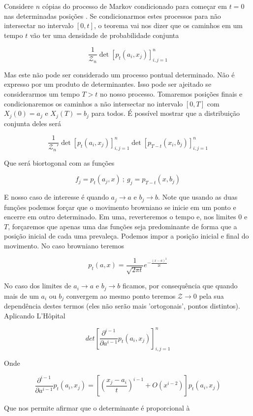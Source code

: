 Considere $n$ cópias do processo de Markov condicionado para começar em $t=0$ nas determinadas posições . Se condicionarmos estes processos para não intersectar no intervalo $[0,t]$, o teorema vai nos dizer que os caminhos em um tempo $t$ vão ter uma densidade de probabilidade conjunta

\[
	\frac{1}{\mathcal{Z}_n} \det{[p_t(a_i, x_j)]^{n}_{i,j=1}}
\]

Mas este não pode ser considerado um processo pontual determinado. Não é expresso por um produto de determinantes. Isso pode ser ajeitado se considerarmos um tempo $T > t$ no nosso processo. Tomaremos  posições finais e condicionaremos os caminhos a não intersectar no intervalo $[0, T]$ com $X_j(0) = a_j$ e $X_j(T) = b_j$ para todos. É possível mostrar que a distribuição conjunta deles será

\[
	\frac{1}{\mathcal{Z}_n'} \det{[p_t(a_i, x_j)]^{n}_{i,j=1}} \det{[p_{T-t}(x_i, b_j)]^{n}_{i,j=1}}
\]

Que será biortogonal com as funções

\[
	f_j = p_t(a_j, x) \ ; \ g_j = p_{T-t}(x, b_j)
\]

E nosso caso de interesse é quando $a_j \rightarrow a$ e $b_j \rightarrow b$. Note que usando as duas funções podemos forçar que o movimento browniano se inicie em um ponto e encerre em outro determinado. Em uma, reverteremos o tempo e, nos limites $0$ e $T$, forçaremos que apenas uma das funções seja predominante de forma que a posição inicial de cada uma prevaleça. Podemos impor a posição inicial e final do movimento. No caso browniano teremos

\[
	p_t(a, x) = \frac{1}{\sqrt{2\pi t}} e^{-\frac{(x-a)^2}{2t}}
\]

No caso dos limites de $a_i \rightarrow a$ e $b_j \rightarrow b$ ficamos, por consequência que quando mais de um $a_i$ ou $b_j$ convergem ao mesmo ponto teremos $\mathcal{Z} \rightarrow 0$ pela sua dependência destes termos (eles não serão mais 'ortogonais', pontos distintos). Aplicando L'Hôpital

\[
	det\left[ \frac{\partial^{i-1}}{\partial a^{i-1}} p_t(a_i, x_j) \right]_{i,j=1}^{n} 
\] 

Onde

\[
	\frac{\partial^{i-1}}{\partial a^{i-1}} p_t(a_i,x_j) = \left[ \left( \frac{x_j - a_i}{t} \right)^{i-1} + O(x^{i-2}) \right] p_t(a_i,x_j)
\]

Que nos permite afirmar que o determinante é proporcional à


